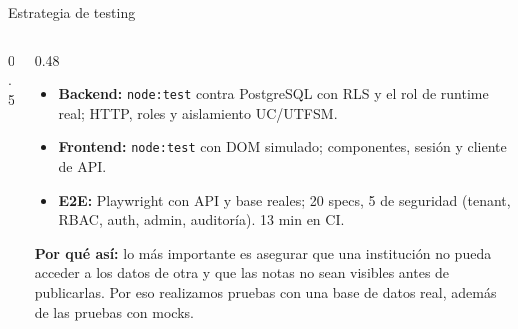 
\begin{frame}{Estrategia de testing}
\begin{columns}[T,onlytextwidth]
\begin{column}{0.5\textwidth}
\centering
{}
\end{column}
\begin{column}{0.48\textwidth}
\scriptsize
\begin{itemize}
  \item \textbf{Backend:} \texttt{node:test} contra PostgreSQL con RLS y el rol de runtime real; HTTP, roles y aislamiento UC/UTFSM.
  \item \textbf{Frontend:} \texttt{node:test} con DOM simulado; componentes, sesión y cliente de API.
  \item \textbf{E2E:} Playwright con API y base reales; 20 specs, 5 de seguridad (tenant, RBAC, auth, admin, auditoría). 13 min en CI.
\end{itemize}
\textbf{Por qué así:} lo más importante es asegurar que una institución no pueda acceder a los datos de otra y que las notas no sean visibles antes de publicarlas. Por eso realizamos pruebas con una base de datos real, además de las pruebas con mocks.
\end{column}
\end{columns}
\end{frame}

